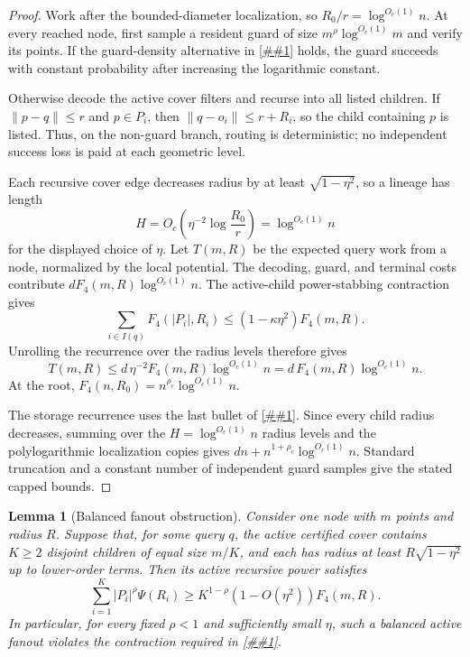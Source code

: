 \documentclass[10pt]{article}
\newcommand{\cref}[1]{\ref{##1}}
\newtheorem{lemma}[theorem]{Lemma}
\theoremstyle{definition}
\begin{document}
\begin{proof}
   Work after the bounded-diameter localization, so $R_0/r=\log^{O_c(1)}n$.
   At every reached node, first sample a resident guard of size
   $m^\rho\log^{O_c(1)}m$ and verify its points. If the guard-density
   alternative in \cref{asm:power-cover} holds, the guard succeeds with
   constant probability after increasing the logarithmic constant.

   Otherwise decode the active cover filters and recurse into all listed
   children. If $\|p-q\|\le r$ and $p\in P_i$, then
   $\|q-o_i\|\le r+R_i$, so the child containing $p$ is listed. Thus, on the
   non-guard branch, routing is deterministic; no independent success loss is
   paid at each geometric level.

   Each recursive cover edge decreases radius by at least
   $\sqrt{1-\eta^2}$, so a lineage has length
   \[
      H=O_c\!\left(\eta^{-2}\log\frac{R_0}{r}\right)
      =
      \log^{O_c(1)}n
   \]
   for the displayed choice of $\eta$. Let $T(m,R)$ be the expected query work
   from a node, normalized by the local potential. The decoding, guard, and
   terminal costs contribute $dF_4(m,R)\log^{O_c(1)}n$. The active-child
   power-stabbing contraction gives
   \[
      \sum_{i\in I(q)}F_4(|P_i|,R_i)
      \le
      (1-\kappa\eta^2)F_4(m,R).
   \]
   Unrolling the recurrence over the radius levels therefore gives
   \[
      T(m,R)\le d\,\eta^{-2}F_4(m,R)\log^{O_c(1)}n
      =
      d\,F_4(m,R)\log^{O_c(1)}n .
   \]
   At the root, $F_4(n,R_0)=n^{\rho_c}\log^{O_c(1)}n$.

   The storage recurrence uses the last bullet of \cref{asm:power-cover}. Since
   every child radius decreases, summing over the $H=\log^{O_c(1)}n$ radius
   levels and the polylogarithmic localization copies gives
   $dn+n^{1+\rho_c}\log^{O_c(1)}n$. Standard truncation and a constant number of
   independent guard samples give the stated capped bounds.
\end{proof}

\begin{lemma}[Balanced fanout obstruction]\label{lem:balanced-fanout-obstruction}
   Consider one node with $m$ points and radius $R$. Suppose that, for some
   query $q$, the active certified cover contains $K\ge2$ disjoint children
   of equal size $m/K$, and each has radius at least
   $R\sqrt{1-\eta^2}$ up to lower-order terms. Then its active recursive
   power satisfies
   \[
      \sum_{i=1}^K |P_i|^\rho\Psi(R_i)
      \ge
      K^{1-\rho}\left(1-O(\eta^2)\right)F_4(m,R).
   \]
   In particular, for every fixed $\rho<1$ and sufficiently small $\eta$, such
   a balanced active fanout violates the contraction required in
   \cref{asm:power-cover}.
\end{lemma}
\end{document}
